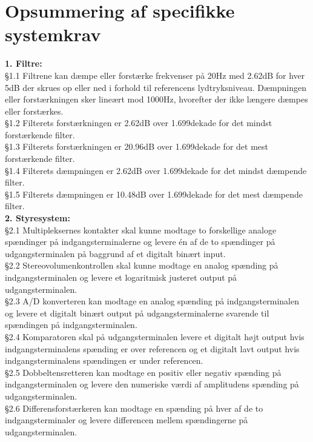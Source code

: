 \section{Opsummering af specifikke systemkrav}
\label{OpsummeringAfSpecifikkeSystemkrav}
\textbf{1. Filtre:}\\
§1.1 Filtrene kan dæmpe eller forstærke frekvenser på 20Hz med 2.62dB for hver 5dB der skrues op eller ned i forhold til referencens lydtryksniveau. Dæmpningen eller forstærkningen sker lineært mod 1000Hz, hvorefter der ikke længere dæmpes eller forstærkes.\\
§1.2 Filterets forstærkningen er 2.62dB over 1.699dekade for det mindst forstærkende filter.\\ 
§1.3 Filterets forstærkningen er 20.96dB over 1.699dekade for det mest forstærkende filter.\\ 
§1.4 Filterets dæmpningen er 2.62dB over 1.699dekade for det mindst dæmpende filter.\\
§1.5 Filterets dæmpningen er 10.48dB over 1.699dekade for det mest dæmpende filter.\\ 
\blankline 
\textbf{2. Styresystem:}\\
§2.1 Multipleksernes kontakter skal kunne modtage to forskellige analoge spændinger på indgangsterminalerne og levere én af de to spændinger på udgangsterminalen på baggrund af et digitalt binært input.\\
%
§2.2 Stereovolumenkontrollen skal kunne modtage en analog spænding på indgangsterminalen og levere et logaritmisk justeret output på udgangsterminalen.\\
%
§2.3 A/D konverteren kan modtage en analog spænding på indgangsterminalen og levere et digitalt binært output på udgangsterminalerne svarende til spændingen på indgangsterminalen.\\ 
%
§2.4 Komparatoren skal på udgangsterminalen levere et digitalt højt output hvis indgangsterminalens spænding er over referencen og et digitalt lavt output hvis indgangsterminalens spændingen er under referencen.\\
%
§2.5 Dobbeltensretteren kan modtage en positiv eller negativ spænding på indgangsterminalen og levere den numeriske værdi af amplitudens spænding på udgangsterminalen.\\
%
§2.6 Differensforstærkeren kan modtage en spænding på hver af de to indgangsterminaler og levere differencen mellem spændingerne på udgangsterminalen.\\
%
\blankline 
